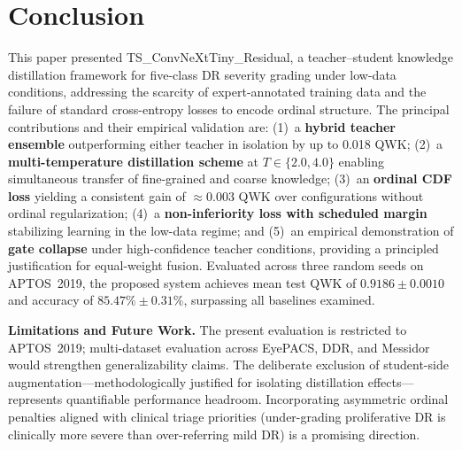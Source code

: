 \documentclass[10pt, twocolumn]{article}
\begin{document}
\section{Conclusion}

This paper presented TS\_ConvNeXtTiny\_Residual, a teacher--student knowledge
distillation framework for five-class DR severity grading under low-data conditions,
addressing the scarcity of expert-annotated training data and the failure of
standard cross-entropy losses to encode ordinal structure. The principal
contributions and their empirical validation are: (1)~a \textbf{hybrid teacher
ensemble} outperforming either teacher in isolation by up to 0.018 QWK; (2)~a
\textbf{multi-temperature distillation scheme} at $T \in \{2.0, 4.0\}$ enabling
simultaneous transfer of fine-grained and coarse knowledge; (3)~an \textbf{ordinal
CDF loss} yielding a consistent gain of $\approx$0.003 QWK over configurations
without ordinal regularization; (4)~a \textbf{non-inferiority loss with scheduled
margin} stabilizing learning in the low-data regime; and (5)~an empirical
demonstration of \textbf{gate collapse} under high-confidence teacher conditions,
providing a principled justification for equal-weight fusion. Evaluated across three
random seeds on APTOS~2019, the proposed system achieves mean test QWK of
$\mathbf{0.9186 \pm 0.0010}$ and accuracy of $\mathbf{85.47\% \pm 0.31\%}$,
surpassing all baselines examined.

\textbf{Limitations and Future Work.} The present evaluation is restricted to
APTOS~2019; multi-dataset evaluation across EyePACS, DDR, and Messidor would
strengthen generalizability claims. The deliberate exclusion of student-side
augmentation---methodologically justified for isolating distillation effects---represents quantifiable performance headroom. Incorporating asymmetric ordinal
penalties aligned with clinical triage priorities (under-grading proliferative DR
is clinically more severe than over-referring mild DR) is a promising direction.


\end{document}
